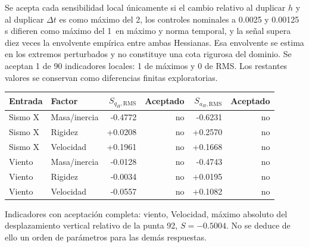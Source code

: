 \documentclass[11pt,a4paper]{article}
\newcommand{\pct}{\text{\char37}}
\begin{document}
Se acepta cada sensibilidad local únicamente si el cambio relativo al duplicar $h$ y al duplicar $\Delta t$ es como máximo del 2\pct, los controles nominales a 0.0025 y 0.00125 s difieren como máximo del 1\pct\ en máximo y norma temporal, y la señal supera diez veces la envolvente empírica entre ambas Hessianas. Esa envolvente se estima en los extremos perturbados y no constituye una cota rigurosa del dominio. Se aceptan 1 de 90 indicadores locales: 1 de máximos y 0 de RMS. Los restantes valores se conservan como diferencias finitas exploratorias.

\begin{center}\small
\begin{tabular}{llrrrr}
\toprule Entrada & Factor & $S_{q_H,\mathrm{RMS}}$ & Aceptado & $S_{a_H,\mathrm{RMS}}$ & Aceptado\\\midrule
Sismo X & Masa/inercia & -0.4772 & no & -0.6231 & no \\
Sismo X & Rigidez & +0.0208 & no & +0.2570 & no \\
Sismo X & Velocidad & +0.1961 & no & +0.1668 & no \\
Viento & Masa/inercia & -0.0128 & no & -0.4743 & no \\
Viento & Rigidez & -0.0034 & no & +0.0195 & no \\
Viento & Velocidad & -0.0557 & no & +0.1082 & no \\
\bottomrule\end{tabular}\end{center}
Indicadores con aceptación completa: viento, Velocidad, máximo absoluto del desplazamiento vertical relativo de la punta 92, $S=-0.5004$. No se deduce de ello un orden de parámetros para las demás respuestas.
\end{document}
